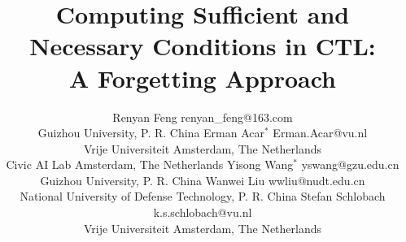 \documentclass[twoside,11pt]{article}
\begin{document}
\newcommand{\CTL}{\textrm{CTL}}
\newcommand{\Tran}{\textrm{Tran}}
\newcommand{\Sub}{\textrm{Sub}}
\newcommand{\NI}{\textrm{NI}}
\newcommand{\Inst}{\textrm{Inst}}
\newcommand{\Com}{\textrm{Com}}
\newcommand{\Rp}{\textrm{Rp}}
\newcommand{\forget}{{\textsc{f}_\CTL}}
\newcommand{\ALL}{\textsc{a}}
\newcommand{\EXIST}{\textsc{e}}
\newcommand{\NEXT}{\textsc{x}}
\newcommand{\FUTURE}{\textsc{f}}
\newcommand{\UNTIL}{\textsc{u}}
\newcommand{\GLOBAL}{\textsc{g}}
\newcommand{\UNLESS}{\textsc{w}}
\newcommand{\Def}{\textrm{def}}
\newcommand{\IR}{\textrm{IR}}
\newcommand{\Tr}{\textrm{Tr}}
\newcommand{\dis}{\textrm{dis}}
\def\PP{\ensuremath{\textbf{PP}}}
\def\NgP{\ensuremath{\textbf{NP}}}
\def\W{\ensuremath{\textbf{W}}}
\newcommand{\Pre}{\textrm{Pre}}
\newcommand{\Post}{\textrm{Post}}


\newcommand{\CTLsnf}{{\textsc{SNF}_{\textsc{ctl}}^g}}
\newcommand{\ResC}{{\textsc{R}_{\textsc{ctl}}^{\succ, S}}}
\newcommand{\CTLforget}{{\textsc{F}_{\textsc{ctl}}}}
\newcommand{\WForget}{{\textsc{WF}_{\textsc{ctl}}}}
\newcommand{\degex}{{\textsc{def}_{\textsc{ex}}}}
\newcommand{\Refine}{\textsc{Refine}}
\newcommand{\cf}{\textrm{cf.}}
\newcommand{\NEXP}{\textmd{\rm NEXP}}
\newcommand{\EXP}{\textmd{\rm EXP}}
\newcommand{\coNEXP}{\textmd{\rm co-NEXP}}
\newcommand{\NP}{\textmd{\rm NP}}
\newcommand{\coNP}{\textmd{\rm co-NP}}
\newcommand{\Pol}{\textmd{\rm P}}
\newcommand{\BH}[1]{\textmd{\rm BH}_{#1}}
\newcommand{\coBH}[1]{\textmd{\rm co-BH}_{#1}}
\newcommand{\Empty}{\emptyset}%
\newcommand{\NLOG}{\textmd{\rm NLOG}}
\newcommand{\DeltaP}[1]{\Delta_{#1}^{p}}
\newcommand{\PIP}[1]{\Pi_{#1}^{p}}
\newcommand{\SigmaP}[1]{\Sigma_{#1}^{p}}


\newcommand{\authorComment}[3]
{{\color{#1}\textbf{[\!\![\!\![\marginpar{\centering{\color{#1}\textbf{#2}}}~ #3 ]\!\!]\!\!]}}}
\newcommand{\Renyan}[1]{\textcolor{red}{#1}}
\newcommand{\Yisong}[1]{\textcolor{blue}{#1}}
\newcommand{\Wanwei}[1]{\textcolor{magenta}{#1}}

	\title{Computing Sufficient and Necessary Conditions in CTL: \\A Forgetting Approach}

\author{\name Renyan Feng \email renyan\_feng@163.com \\
	\addr Guizhou University, P. R. China
	\AND
	\name Erman Acar$^*$ \email Erman.Acar@vu.nl \\
	\addr Vrije Universiteit Amsterdam, The Netherlands\\
Civic AI Lab Amsterdam, The Netherlands
	\AND
	\name Yisong Wang$^*$ \email yswang@gzu.edu.cn \\
	\addr Guizhou University, P. R. China
	\AND
	\name Wanwei Liu \email wwliu@nudt.edu.cn \\
	\addr National University of Defense Technology, P. R. China
	\AND
	\name Stefan Schlobach \email k.s.schlobach@vu.nl \\
	\addr Vrije Universiteit Amsterdam, The Netherlands
}
\end{document}
